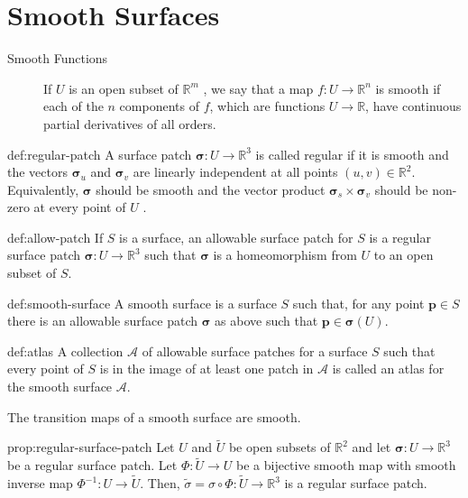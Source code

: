 \documentclass{notes}
\newcommand{\bsigma}{\bm{\sigma}}
\begin{document}
 
\section{Smooth Surfaces}
 \begin{description}
	 \item[Smooth Functions] If \(U\) is an open subset of \(\mathbb{R}^m\) , we say that a map $f : U \to \mathbb{R}^n$ is smooth
	 if each of the \(n\) components of \(f\), which are functions \(U \to \mathbb{R}\), have continuous
	 partial derivatives of all orders. 
 \end{description}

\begin{definition}{def:regular-patch}
	A surface patch \(\bsigma : U \to \mathbb{R}^3\) is called regular if it is smooth and the vectors
	\(\bsigma_u\) and \(\bsigma_v\) are linearly independent at all points \((u, v)\in \mathbb{R}^2\). Equivalently, \(\bsigma\) 
	should be smooth and the vector product \(\bsigma_s \times \bsigma_v\) should be non-zero at every
	point of \(U\) .
\end{definition}
\begin{definition}{def:allow-patch}
	If \(S\) is a surface, an allowable surface patch for \(S\) is a regular surface patch
	\(\bsigma : U \to \mathbb{R}^3\) such that \(\bsigma\) is a homeomorphism from \(U\) to an open subset of \(S\).
\end{definition}

\begin{definition}{def:smooth-surface}
	A smooth surface is a surface \(S\) such that, for any point \(\mathbf{p}\in S\) there is an
	allowable surface patch \(\bsigma\) as above such that \(\mathbf{p}\in \bsigma(U)\). 
\end{definition}
\begin{definition}[Atlas]{def:atlas}
	A collection \(\mathcal{A}\) of
	allowable surface patches for a surface \(S\) such that every point of \(S\) is in the
	image of at least one patch in \(\mathcal{A}\) is called an atlas for the smooth surface \(\mathcal{A}\).
\end{definition}
\begin{proposition}{}
	The transition maps of a smooth surface are smooth.
\end{proposition}

\begin{proposition}{prop:regular-surface-patch}
	Let \(U\) and $\tilde{U}$ be open subsets of \(\mathbb{R}^2\) and let \(\bsigma : U \to \mathbb{R}^3\) be a regular surface
patch. Let \(\Phi : \tilde{U} \to U\) be a bijective smooth map with smooth inverse map
\(\Phi^{-1} : U\to \tilde{U} \). Then, \(\tilde{\sigma} = \sigma\circ \Phi : \tilde{U}\to \mathbb{R}^3\) is a regular 
surface patch.
\end{proposition}
\end{document}
